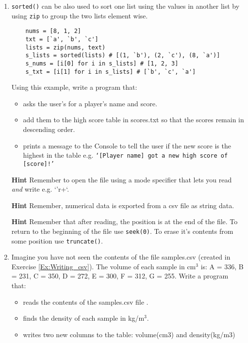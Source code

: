 \documentclass[11pt]{report}
\begin{document}



\begin{enumerate}[label=(\Alph*)]
    
    \item {\tt sorted()} can be also used to sort one list using the values in another list by using {\tt zip} to group the two lists element wise.
    \vspace{0.5 em}
    \begin{verbatim}
    nums = [8, 1, 2]
    txt = [`a', `b', `c']
    lists = zip(nums, text) 
    s_lists = sorted(lists) # [(1, `b'), (2, `c'), (8, `a')]
    s_nums = [i[0] for i in s_lists] # [1, 2, 3]
    s_txt = [i[1] for i in s_lists] # [`b', `c', `a']
    \end{verbatim}

    Using this example, write a program that:
    \begin{itemize}
        \item asks the user's for a player's name and score.
        \item add them to the high score table in scores.txt so that the scores remain in descending order.
        \item prints a message to the Console to tell the user if the new score is the highest in the table e.g. {\tt `[Player name] got a new high score of [score]!'} 
    \end{itemize}
    
    {\bf Hint} Remember to open the file using a mode specifier that lets you read {\it and} write e.g. `'r+`.
    
    {\bf Hint} Remember, numerical data is exported from a  csv file as string data. 
    
    {\bf Hint} Remember that after reading, the position is at the end of the file. To return to the beginning of the file use {\tt seek(0)}. To erase it's contents from some position use {\tt truncate()}. 
    
    \item  Imagine you have not seen the contents of the file samples.csv (created in Exercise \ref{Ex:Writing_csv}). The volume of each sample in cm$^3$ is: A = 336, B = 231, C = 350, D = 272, E = 300, F = 312, G = 255. Write a program that:
    {\begin{itemize}
        \item reads the contents of the samples.csv file .
        \item finds the density of each sample in kg/m$^3$.
        \item writes two new columns to the table: volume(cm3) and density(kg/m3)
    \end{itemize}} 
    
 
    
\end{enumerate}
\end{document}
